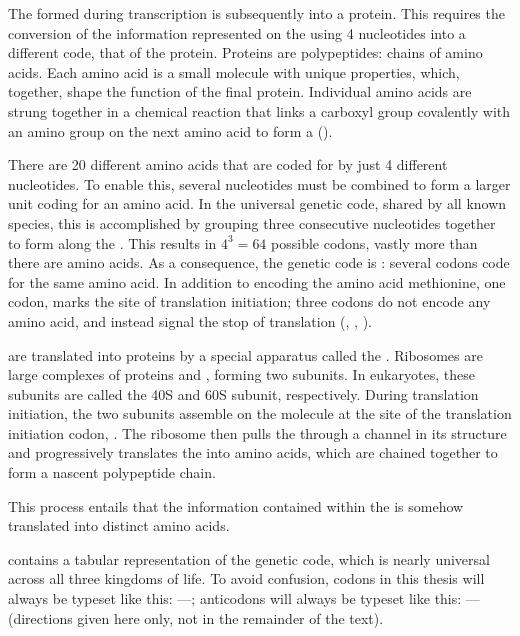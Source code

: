 The \mrna formed during transcription is subsequently  into a
protein. This requires the conversion of the information represented on the
\mrna using \num{4} nucleotides  into a different code, that of the protein.
Proteins are polypeptides: chains of amino acids. Each amino acid is a small
molecule with unique properties, which, together, shape the function of the
final protein. Individual amino acids are strung together in a chemical reaction
that links a carboxyl group covalently with an amino group on the next amino
acid to form a  ().

There are \num{20} different amino acids that are coded for by just \num{4}
different nucleotides. To enable this, several nucleotides must be combined to
form a larger unit coding for an amino acid. In the universal genetic code,
shared by all known species, this is accomplished by grouping three consecutive
nucleotides together to form  along the \mrna. This results in
\(4^3 = 64\) possible codons, vastly more than there are amino acids. As a
consequence, the genetic code is : several codons code for
the same amino acid. In addition to encoding the amino acid methionine, one
codon,  marks the site of translation initiation; three codons do not
encode any amino acid, and instead signal the stop of translation (,
, ).

\mrna[s] are translated into proteins by a special apparatus called the
. Ribosomes are large complexes of proteins and \rrna, forming
two subunits. In eukaryotes, these subunits are called the 40S and 60S subunit,
respectively. During translation initiation, the two subunits assemble on the
\mrna molecule at the site of the translation initiation codon, . The
ribosome then pulls the \mrna through a channel in its structure and
progressively translates the \mrna into amino acids, which are chained together
to form a nascent polypeptide chain.

This process entails that the information contained within the \mrna is somehow
translated into distinct amino acids.

 contains a tabular representation of the genetic code,
which is nearly universal across all three kingdoms of life. To avoid confusion,
codons in this thesis will always be typeset like this:
\fivep----\threep; anticodons will always be typeset like this:
\threep----\fivep (directions given here only, not in the
remainder of the text).

